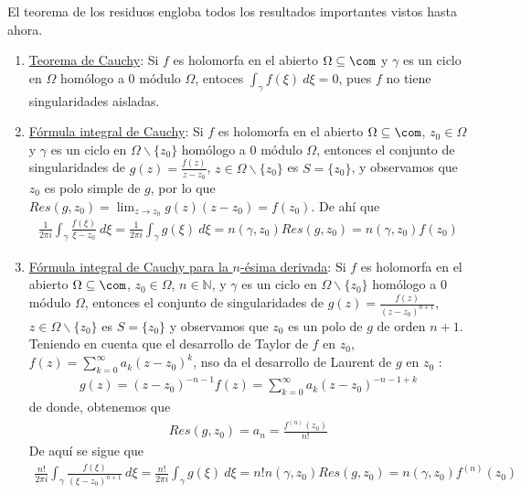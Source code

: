 \begin{obs}
El teorema de los residuos engloba todos los resultados importantes vistos hasta ahora.
\begin{enumerate}
    \item \underline{Teorema de Cauchy}: Si $f$ es holomorfa en el abierto $\Omega \subseteq \com$ y $\gamma$ es un ciclo en $\Omega$ homólogo a 0 módulo $\Omega$, entoces $\int_{\gamma}{f(\xi) \ d\xi} = 0$, pues $f$ no tiene singularidades aisladas.
    \item \underline{Fórmula integral de Cauchy}: Si $f$ es holomorfa en el abierto $\Omega \subseteq \com$, $z_0 \in \Omega$ y $\gamma$ es un ciclo en $\Omega \backslash \{z_0\}$ homólogo a 0 módulo $\Omega$, entonces el conjunto de singularidades de $g(z) = \frac{f(z)}{z-z_0}$, $z \in \Omega \backslash \{z_0\}$ es $S = \{z_0\}$, y observamos que $z_0$ es polo simple de $g$, por lo que $Res(g,z_0) = \lim_{z \to z_0} g(z)(z-z_0) = f(z_0)$. De ahí que 
    \begin{align*}
        \frac{1}{2\pi i}\int_{\gamma} \frac{f(\xi)}{\xi - z_0} \ d\xi = \frac{1}{2\pi i} \int_{\gamma} g(\xi) \ d\xi = n(\gamma,z_0)Res(g,z_0) = n(\gamma,z_0)f(z_0)
    \end{align*}
    \item \underline{Fórmula integral de Cauchy para la $n$-ésima derivada}: Si $f$ es holomorfa en el abierto $\Omega \subseteq \com$, $z_0 \in \Omega$, $n \in \mathbb{N}$, y $\gamma$ es un ciclo en $\Omega \backslash \{z_0\}$ homólogo a 0 módulo $\Omega$, entonces el conjunto de singularidades de $g(z) = \frac{f(z)}{(z-z_0)^{n+1}}$, $z \in \Omega \backslash \{z_0\}$ es $S = \{z_0\}$ y observamos que $z_0$ es un polo de $g$ de orden $n+1$. Teniendo en cuenta que el desarrollo de Taylor de $f$ en $z_0$, $f(z) = \sum_{k=0}^{\infty}{a_k (z-z_0)^k}$, nso da el desarrollo de Laurent de $g$ en $z_0$ : 
    \begin{align*}
        g(z) = (z-z_0)^{-n-1}f(z) = \sum_{k=0}^{\infty}{a_k(z-z_0)^{-n-1+k}}
    \end{align*}
    de donde, obtenemos que
    \begin{align*}
        Res(g,z_0) = a_n = \frac{f^{(n)}(z_0)}{n!}
    \end{align*}
    De aquí se sigue que
    \begin{align*}
        \frac{n!}{2\pi i} \int_{\gamma} \frac{f(\xi)}{(\xi - z_0)^{n+1}} \ d\xi = \frac{n!}{2\pi i} \int_{\gamma} g(\xi) \ d\xi = n!n(\gamma,z_0)Res(g,z_0) = n(\gamma,z_0)f^{(n)}(z_0)
    \end{align*}
\end{enumerate}
\end{obs}

